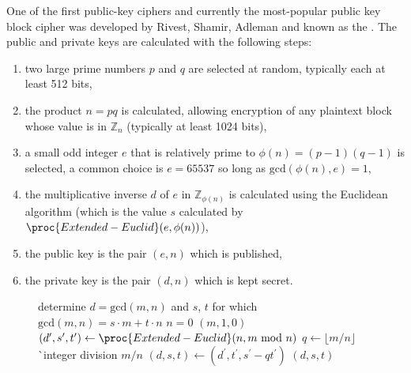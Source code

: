 One of the first public-key ciphers and currently the most-popular
public key block cipher
was developed by Rivest, Shamir, Adleman and known as the .
The public and private keys are calculated with the following steps:
\begin{enumerate}
  \item two large prime numbers $p$ and $q$ are selected at random,
  typically each at least 512 bits,
  \item the product $n=pq$ is calculated, allowing encryption
  of any plaintext block whose value is in $\mathbb{Z}_n$
  (typically at least 1024 bits),
  \item a small odd integer $e$ that is relatively prime to
  $\phi(n)=(p-1)(q-1)$ is selected, a common choice is $e=65537$ so long
  as $\mbox{gcd}(\phi(n),e)=1$,
  \item the multiplicative inverse $d$ of $e$ in $\mathbb{Z}_{\phi(n)}$ is calculated
  using the Euclidean algorithm (which is the value $s$ calculated by
  $\proc{Extended-Euclid}(e, \phi(n))$),
  \item the public key is the pair $(e, n)$ which is published,
  \item the private key is the pair $(d, n)$ which is kept secret.
\end{enumerate}
\begin{figure*}[htb]
\begin{codebox}
\li \Comment determine $d=\mbox{gcd}(m,n)$ and $s$, $t$ for which
   $\mbox{gcd}(m,n)=s\cdot m+t\cdot n$
\li \If $n=0$ \Then
\li    \Return $(m, 1, 0)$
    \End
\li $(d^\prime, s^\prime, t^\prime) \gets \proc{Extended-Euclid}(n,m\mbox{ mod }n)$
\li $q \gets \lfloor m/n\rfloor$ \`\Comment integer division $m/n$
\li $(d, s, t) \gets (d^\prime, t^\prime, s^\prime - q t^\prime)$
\li \Return $(d, s, t)$
\end{codebox}
\end{figure*}

